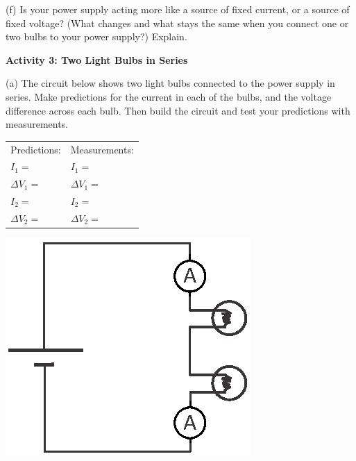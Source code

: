 (f) Is your power supply acting more like a source of fixed current, or a source of fixed voltage?  (What changes and what stays the same when you connect one or two bulbs to your power supply?) Explain.
\answerspace{0.6 in}


\pagebreak[2]
\textbf{Activity 3: Two Light Bulbs in Series} \par

(a) The circuit below shows two light bulbs connected to the power supply in series.  Make predictions for the current in each of the bulbs, and the voltage difference across each bulb.  Then build the circuit and test your predictions with measurements.  \par


\begin{minipage}{0.7\textwidth}
\vspace{0.1 in}
{\renewcommand{\arraystretch}{1.6}
\hspace*{0.5in}
\begin{tabular}{l l}
Predictions: \hspace{0.5in} & Measurements: \\
$I_1 =$ & $I_1 =$ \\
$\Delta V_1 =$ & $\Delta V_1 =$ \\
$I_2 =$ & $I_2 =$ \\
$\Delta V_2 =$ & $\Delta V_2 =$ \\
\end{tabular}}
\vspace{0.3in}
\end{minipage}
\begin{minipage}{0.29\textwidth}
\includegraphics[width=\textwidth]{electric_circuits/circ_diag4.eps}
\end{minipage}

